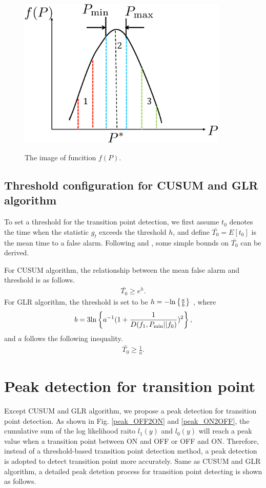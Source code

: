 \begin{center}
  \begin{figure}[t]
    \centering
    \includegraphics[width=100mm]{fp.eps}
    \label{concave}
    \caption{The image of funcition $f(P)$.}
  \end{figure}
\end{center} 

\subsection{Threshold configuration for CUSUM and GLR algorithm}
To set a threshold for the transition point detection, we first assume $t_0$ denotes the time when the statistic $g_t$ exceeds the threshold $h$, and define $\bar{T_0}=E[t_0]$ is the mean time to a false alarm. Following \cite{ref:threshold_cusum} and \cite{ref:threshold_GLR}, some simple bounds on $\bar{T_0}$ can be derived.

For CUSUM algorithm, the relationship between the mean false alarm and threshold is as follows.
\begin{eqnarray}
\bar{T_0} \geq e^h.
\end{eqnarray}
For GLR algorithm, the threshold is set to be $h=-{\rm ln}\left\{\frac{a}{b}\right\}$ , where 
\begin{eqnarray}
b=3{\rm ln}\left\{a^{-1}(1+\frac{1}{D(f_1,P_{{\rm min}}||f_0)})^2\right\},
\end{eqnarray}
and $a$ follows the following inequality.
\begin{eqnarray}
\bar{T_0} \geq \frac{1}{a}.
\end{eqnarray}

\section{Peak detection for transition point}
\label{PeakD}
Except CUSUM and GLR algorithm, we propose a peak detection for transition point detection. As shown in Fig. \ref{peak_OFF2ON} and \ref{peak_ON2OFF}, the cumulative sum of the log likelihood raito $l_1(y)$ and $l_0(y)$ will reach a peak value when a transition point between ON and OFF or OFF and ON. Therefore, instead of a threshold-based transition point detection method, a peak detection is adopted to detect transition point more accurately. Same as CUSUM and GLR algorithm, a detailed peak detetion process for transition point detecting is shown as follows.  

